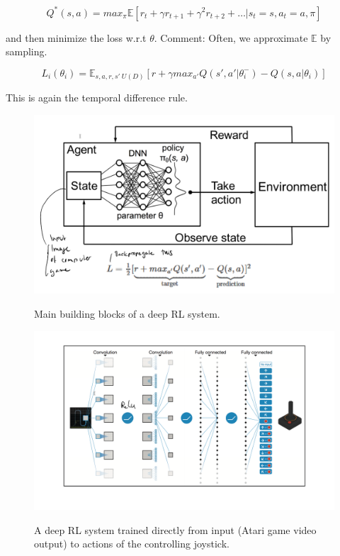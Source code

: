 \documentclass[main]{subfiles}
\begin{document}
\begin{equation}
    Q^*(s,a) =  max_\pi \mathbb{E}[r_t + \gamma r_{t+1} + \gamma^2 r_{t+2} + \dots | s_t =  s, a_t = a, \pi]
\end{equation}

and then minimize the loss w.r.t $\theta$. Comment: Often, we approximate $\mathbb{E}$ by sampling.

\begin{equation}
    L_i(\theta_i) = \mathbb{E}_{s,a,r,s'~U(D)} [r+ \gamma max_{a'}Q(s',a'|\theta_i^-) - Q(s,a|\theta_i)]
\end{equation}

This is again the temporal difference rule.

\begin{figure}[H]
	\centering
	\includegraphics[width=0.9\linewidth]{08_ReinforcementLearning/figures/deep-rl-1.png}
	\label{fig:rl-basic-comps}
	\caption{Main building blocks of a deep RL system.}
\end{figure}

\begin{figure}[H]
	\centering
	\includegraphics[width=0.9\linewidth]{08_ReinforcementLearning/figures/deep-rl-example.png}
	\label{fig:deep-rl-example}
	\caption{A deep RL system trained directly from input (Atari game video output) to actions of the controlling joystick.}
\end{figure}
\end{document}
